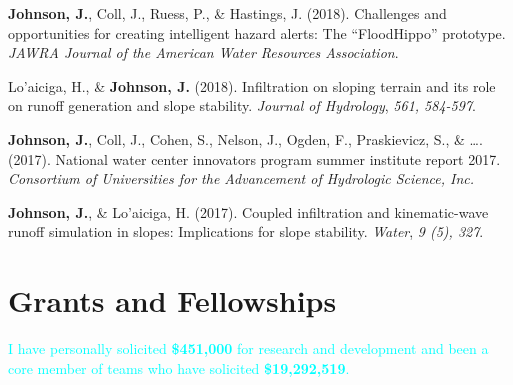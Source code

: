 \documentclass[11pt,a4paper,]{awesome-cv}
\begin{document}
\leavevmode{}%
\textbf{Johnson, J.}, Coll, J., Ruess, P., \& Hastings, J. (2018).
Challenges and opportunities for creating intelligent hazard alerts: The
{``FloodHippo''} prototype. \emph{JAWRA Journal of the American Water
Resources Association}.

\leavevmode{}%
Lo'aiciga, H., \& \textbf{Johnson, J.} (2018). Infiltration on sloping
terrain and its role on runoff generation and slope stability.
\emph{Journal of Hydrology}, \emph{561, 584-597}.

\leavevmode{}%
\textbf{Johnson, J.}, Coll, J., Cohen, S., Nelson, J., Ogden, F.,
Praskievicz, S., \& \ldots. (2017). National water center innovators
program summer institute report 2017. \emph{Consortium of Universities
for the Advancement of Hydrologic Science, Inc.}

\leavevmode{}%
\textbf{Johnson, J.}, \& Lo'aiciga, H. (2017). Coupled infiltration and
kinematic-wave runoff simulation in slopes: Implications for slope
stability. \emph{Water}, \emph{9 (5), 327}.

\hypertarget{grants-and-fellowships}{%
\section{Grants and Fellowships}\label{grants-and-fellowships}}

\textcolor{cyan}{I have personally solicited \textbf{\$451,000} for research and development and been a core member of teams who have solicited \textbf{\$19,292,519}.}
\end{document}
